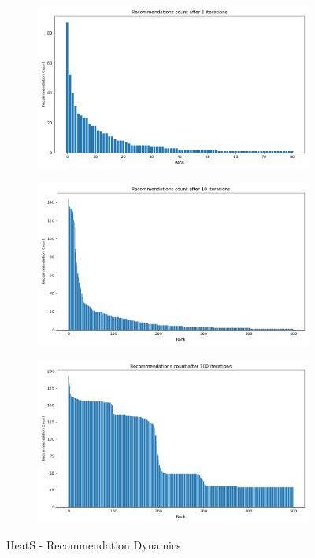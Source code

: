 \documentclass[12pt]{article}
\numberwithin{equation}{section}
\begin{document}
\begin{figure}[!ht]
\begin{subfigure}[b]{0.32\textwidth}
    \includegraphics[width=\textwidth]{Heat S movie recommendations - 1 iterations.png}
\end{subfigure}
\hfill
\begin{subfigure}[b]{0.32\textwidth}
    \includegraphics[width=\textwidth]{Heat S movie recommendations - 10 iterations.png}
\end{subfigure}
\hfill
\begin{subfigure}[b]{0.32\textwidth}
    \includegraphics[width=\textwidth]{Heat S movie recommendations - 100 iterations.png}
\end{subfigure}

\caption{HeatS - Recommendation Dynamics}
\label{fig:temporal heat S}

\end{figure}
\end{document}

